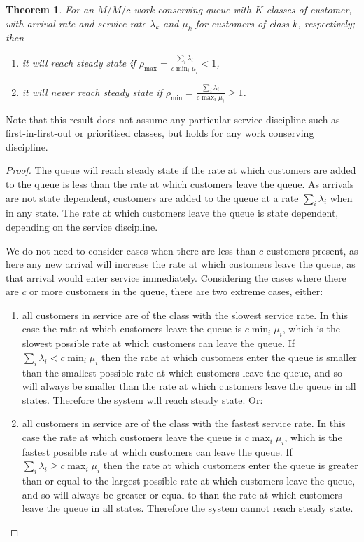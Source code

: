 \documentclass{article}
\newtheorem{theorem}{Theorem}
\begin{document}
\begin{theorem}\label{thrm:steadystate}
For an $M/M/c$ work conserving queue with $K$ classes of customer, with arrival
rate and service rate $\lambda_k$ and  $\mu_k$ for customers of class $k$,
respectively; then
\begin{enumerate}
  \item it will reach steady state if
  $\rho_{\max} = \frac{\sum_i \lambda_i}{c \min_i \mu_i} < 1$,
  \item it will never reach steady state if
  $\rho_{\min} = \frac{\sum_i \lambda_i}{c \max_i \mu_i} \geq 1$.
\end{enumerate}
\end{theorem}

Note that this result does not assume any particular service discipline such as
first-in-first-out or prioritised classes, but holds for any work conserving
discipline.

\begin{proof}
The queue will reach steady state if the rate at which customers are added to
the queue is less than the rate at which customers leave the queue.
As arrivals are not state dependent, customers are added to the queue at a rate
$\sum_i \lambda_i$ when in any state.
The rate at which customers leave the queue is state dependent, depending on the
service discipline.

We do not need to consider cases when there are less than $c$ customers present,
as here any new arrival will increase the rate at which customers leave the
queue, as that arrival would enter service immediately.
Considering the cases where there are $c$ or more customers in the queue, there
are two extreme cases, either:

\begin{enumerate}
  \item all customers in service are of the class with the slowest service rate.
  In this case the rate at which customers leave the queue is $c \min_i \mu_i$,
  which is the slowest possible rate at which customers can leave the queue.
  If $\sum_i \lambda_i < c \min_i \mu_i$ then the rate at which customers enter
  the queue is smaller than the smallest possible rate at which customers leave
  the queue, and so will always be smaller than the rate at which customers
  leave the queue in all states. Therefore the system will reach steady state.
  Or:
  \item all customers in service are of the class with the fastest service rate.
  In this case the rate at which customers leave the queue is $c \max_i \mu_i$,
  which is the fastest possible rate at which customers can leave the queue.
  If $\sum_i \lambda_i \geq c \max_i \mu_i$ then the rate at which customers
  enter the queue is greater than or equal to the largest possible rate at which
  customers leave the queue, and so will always be greater or equal to than the
  rate at which customers leave the queue in all states. Therefore the system
  cannot reach steady state.
\end{enumerate}
\end{proof}
\end{document}
